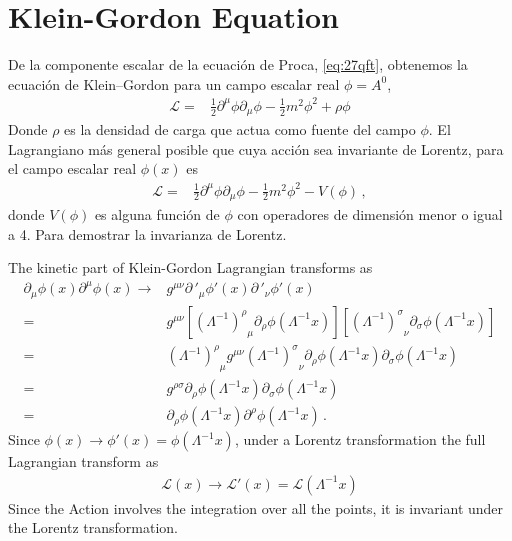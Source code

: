 \section{Klein-Gordon Equation}
\label{sec:klein-gord-equat}

De la componente escalar de la ecuación de Proca, \eqref{eq:27qft}, obtenemos la ecuación de Klein--Gordon para un campo escalar real $\phi=A^0$,
\begin{align}
  \label{eq:kge}
  \mathcal{L}=&\frac{1}{2}\partial^\mu\phi\partial_\mu\phi-\frac{1}{2}m^2\phi^2+\rho\phi
\end{align}
Donde $\rho$ es la densidad de carga que actua como fuente del campo $\phi$. El Lagrangiano más general posible que cuya acción sea invariante de Lorentz, para el campo escalar real $\phi(x)$ es
\begin{align}
 \label{eq:kgeall}
   \mathcal{L}=&\frac{1}{2}\partial^\mu\phi\partial_\mu\phi-\frac{1}{2}m^2\phi^2-V(\phi)\,,
\end{align}
donde $V(\phi)$ es alguna función de $\phi$ con operadores de dimensión menor o igual a 4. Para demostrar la invarianza de Lorentz.

The kinetic part of Klein-Gordon Lagrangian transforms as
\begin{align}
  \partial_\mu\phi(x)\partial^\mu\phi(x)\to&g^{\mu\nu}{\partial\,'}_\mu\phi'(x){\partial\,'}_\nu\phi'(x)\nonumber\\
  =&g^{\mu\nu}\left[{\left(\Lambda^{-1}\right)^\rho}_\mu\partial_\rho\phi\left(\Lambda^{-1}x\right)\right]
  \left[{\left(\Lambda^{-1}\right)^\sigma}_\nu\partial_\sigma\phi\left(\Lambda^{-1}x\right)\right]\nonumber\\
    =&{\left(\Lambda^{-1}\right)^\rho}_\mu g^{\mu\nu}{\left(\Lambda^{-1}\right)^\sigma}_\nu\partial_\rho\phi\left(\Lambda^{-1}x\right)
  \partial_\sigma\phi\left(\Lambda^{-1}x\right)\nonumber\\
    =&g^{\rho\sigma}\partial_\rho\phi\left(\Lambda^{-1}x\right)
  \partial_\sigma\phi\left(\Lambda^{-1}x\right)\nonumber\\
=&\partial_\rho\phi\left(\Lambda^{-1}x\right)
  \partial^\rho\phi\left(\Lambda^{-1}x\right)\,.
\end{align}
Since $\phi(x)\to\phi'(x)=\phi\left(\Lambda^{-1}x\right)$, under a Lorentz transformation the full Lagrangian transform as
\begin{align}
  \mathcal{L}(x)\to\mathcal{L}'(x)=\mathcal{L}(\Lambda^{-1}x) 
\end{align}
Since the Action involves the integration over all the points, it is invariant under the Lorentz transformation.


